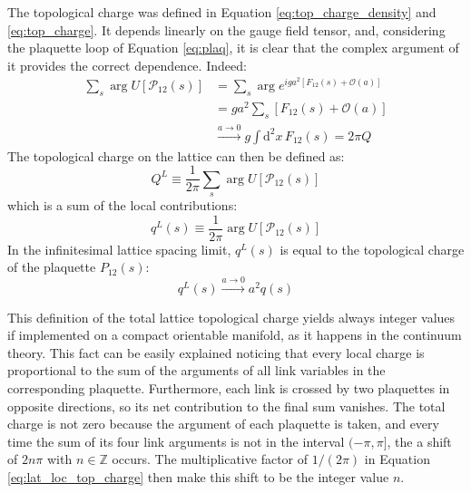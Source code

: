The topological charge was defined in Equation \eqref{eq:top_charge_density} and \eqref{eq:top_charge}.
It depends linearly on the gauge field tensor, and,
considering the plaquette loop of Equation \eqref{eq:plaq},
it is clear that the complex argument of it provides the correct dependence.
Indeed:
\[
    \begin{aligned}
        \sum_s\arg U[\mathcal P_{12}(s)] &= \sum_s\arg e^{iga^2\left[F_{12}(s) + \mathcal O\left(a\right)\right]} \\
                                        &= ga^2\sum_s\left[F_{12}(s) + \mathcal O\left(a\right)\right] \\
                                        &\xrightarrow{a\to0} g\int\mathrm d^2x\,F_{12}(s) = 2\pi Q
    \end{aligned}
\]
The topological charge on the lattice can then be defined as:
\begin{equation}\label{eq:lat_top_charge}
    Q^L \equiv \frac{1}{2\pi}\sum_s\arg U[\mathcal P_{12}(s)]
\end{equation}
which is a sum of the local contributions:
\begin{equation}\label{eq:lat_loc_top_charge}
    q^L(s) \equiv \frac{1}{2\pi}\arg U[\mathcal P_{12}(s)]
\end{equation}
In the infinitesimal lattice spacing limit, $q^L(s)$ is equal to the topological charge of the plaquette $P_{12}(s)$:
\[
    q^L(s) \xrightarrow{a\to0} a^2q(s)
\]


This definition of the total lattice topological charge yields always integer values if implemented on a compact orientable manifold,
as it happens in the continuum theory.
This fact can be easily explained noticing that every local charge is proportional to the sum of the arguments of all link variables in the corresponding plaquette.
Furthermore, each link is crossed by two plaquettes in opposite directions, so its net contribution to the final sum vanishes.
The total charge is not zero because the argument of each plaquette is taken,
and every time the sum of its four link arguments is not in the interval $(-\pi,\pi]$,
the a shift of $2n\pi$ with $n\in\mathbb Z$ occurs.
The multiplicative factor of $1/(2\pi)$ in Equation \eqref{eq:lat_loc_top_charge} then make this shift to be the integer value $n$.

